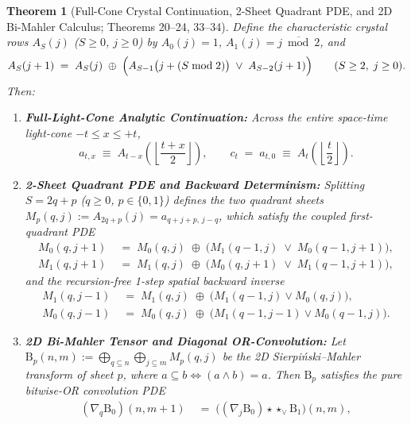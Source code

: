 \documentclass[11pt,a4paper]{article}
\newtheorem{theorem}{Theorem}[section]
\theoremstyle{definition}
\theoremstyle{remark}
\begin{document}
\begin{theorem}[Full-Cone Crystal Continuation, 2-Sheet Quadrant PDE, and 2D Bi-Mahler Calculus; Theorems 20--24, 33--34]\label{thm:bimahler}
Define the characteristic crystal rows $A_S(j)$ ($S \ge 0$, $j \ge 0$) by $A_0(j) = 1$, $A_1(j) = \overline{j \bmod 2}$, and
\begin{equation}
  A_S(j+1) \;=\; A_S(j) \;\oplus\; \Bigl(A_{S-1}\bigl(j + (S \bmod 2)\bigr) \;\lor\; A_{S-2}(j+1)\Bigr) \qquad (S \ge 2,\; j \ge 0).
\end{equation}
Then:
\begin{enumerate}
  \item \textbf{Full-Light-Cone Analytic Continuation:} Across the entire space-time light-cone $-t \le x \le +t$,
  \begin{equation}
    a_{t,x} \;\equiv\; A_{t-x}\!\left(\left\lfloor \frac{t+x}{2} \right\rfloor\right), \qquad
    c_t \;=\; a_{t,0} \;\equiv\; A_t\!\left(\left\lfloor \frac{t}{2} \right\rfloor\right).
  \end{equation}
  \item \textbf{2-Sheet Quadrant PDE and Backward Determinism:} Splitting $S = 2q + p$ ($q \ge 0$, $p \in \{0,1\}$) defines the two quadrant sheets $M_p(q,j) := A_{2q+p}(j) = a_{q+j+p,\, j-q}$, which satisfy the coupled first-quadrant PDE
  \begin{align}
    M_0(q, j+1) &\;=\; M_0(q, j) \;\oplus\; \bigl(M_1(q-1, j) \;\lor\; M_0(q-1, j+1)\bigr),\\
    M_1(q, j+1) &\;=\; M_1(q, j) \;\oplus\; \bigl(M_0(q, j+1) \;\lor\; M_1(q-1, j+1)\bigr),
  \end{align}
  and the recursion-free 1-step spatial backward inverse
  \begin{align}
    M_1(q, j-1) &\;=\; M_1(q, j) \;\oplus\; \bigl(M_1(q-1, j) \lor M_0(q, j)\bigr),\\
    M_0(q, j-1) &\;=\; M_0(q, j) \;\oplus\; \bigl(M_1(q-1, j-1) \lor M_0(q-1, j)\bigr).
  \end{align}
  \item \textbf{2D Bi-Mahler Tensor and Diagonal OR-Convolution:} Let $\mathrm{B}_p(n,m) := \bigoplus_{q \subseteq n}\bigoplus_{j \subseteq m} M_p(q,j)$ be the 2D Sierpi\'nski--Mahler transform of sheet $p$, where $a \subseteq b \iff (a \land b) = a$. Then $\mathrm{B}_p$ satisfies the pure bitwise-OR convolution PDE
  \begin{align}
    (\nabla_q \mathrm{B}_0)(n, m+1) &\;=\; \bigl((\nabla_j \mathrm{B}_0) \star\star_{\lor} \mathrm{B}_1\bigr)(n, m),\\

\end{align}
\end{enumerate}
\end{theorem}
\end{document}
